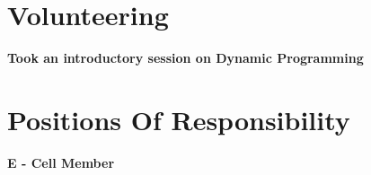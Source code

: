 \documentclass[]{deedy-resume-openfont}
\begin{document}
\begin{minipage}[t]{0.66\textwidth}
\section{Volunteering} 
\vspace{\topsep} %
\begin{tightemize}
\item \bf Took an introductory session on Dynamic Programming
\end{tightemize}
\sectionsep

\section{Positions Of Responsibility} 
\vspace{\topsep} %
\begin{tightemize}
\item \bf E - Cell Member
\end{tightemize}
\sectionsep



\end{minipage} 
\end{document}
